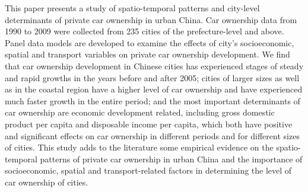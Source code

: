 This paper presents a study of spatio-temporal patterns and city-level determinants of private car ownership in urban China. Car ownership data from 1990 to 2009 were collected from 235 cities of the prefecture-level and above. Panel data models are developed to examine the effects of city's socioeconomic, spatial and transport variables on private car ownership development. We find that car ownership development in Chinese cities has experienced stages of steady and rapid growths in the years before and after 2005; cities of larger sizes as well as in the coastal region have a higher level of car ownership and have experienced much faster growth in the entire period; and the most important determinants of car ownership are economic development related, including gross domestic product per capita and disposable income per capita, which both have positive and significant effects on car ownership in different periods and for different sizes of cities. This study adds to the literature some empirical evidence on the spatio-temporal patterns of private car ownership in urban China and the importance of socioeconomic, spatial and transport-related factors in determining the level of car ownership of cities.
